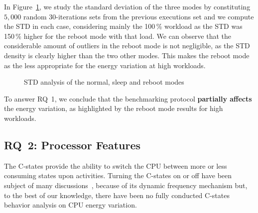 In Figure~\ref{fig:reboot}, we study the standard deviation of the three modes by constituting $5,000$ random 30-iterations sets from the previous executions set and we compute the STD in each case, considering mainly the 100\,\% workload as the STD was 150\,\% higher for the \textsf{reboot} mode with that load.
We can observe that the considerable amount of outliers in the \textsf{reboot} mode is not negligible, as the STD density is clearly higher than the two other modes.
This makes the \textsf{reboot} mode as the less appropriate for the energy variation at high workloads.

\begin{figure}
    \caption{STD analysis of the \textsf{normal}, \textsf{sleep} and \textsf{reboot} modes}\label{fig:reboot}
\end{figure}

\begin{mdframed}[skipabove=\topsep,skipbelow=\topsep]

    To answer \textsc{RQ~1}, we conclude that the benchmarking protocol \textbf{partially affects} the energy variation, as highlighted by the \textsf{reboot} mode results for high workloads.

\end{mdframed}


\subsection{\textsc{RQ}~2: Processor Features}
The C-states provide the ability to switch the CPU between more or less consuming states upon activities.
Turning the C-states on or off have been subject of many discussions~\cite{5463056}, because of its dynamic frequency mechanism but, to the best of our knowledge, there have been no fully conducted C-states behavior analysis on CPU energy variation.

